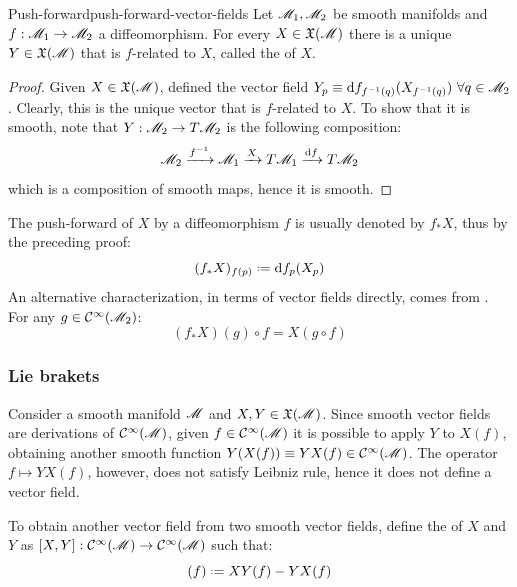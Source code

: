 \begin{theorem}{Push-forward}{push-forward-vector-fields}
  Let $ \mathscr{M}_1 , \mathscr{M}_2 $ be smooth manifolds and $ f : \mathscr{M}_1 \rightarrow \mathscr{M}_2 $ a diffeomorphism. For every $ X \in \mathfrak{X}(\mathscr{M}) $ there is a unique $ Y \in \mathfrak{X}(\mathscr{M}) $ that is $ f $-related to $ X $, called the  of $ X $.
\end{theorem}

\begin{proofbox}
  \begin{proof}
    Given $ X \in \mathfrak{X}(\mathscr{M}) $, defined the vector field $ Y_p \equiv \mathrm{d} f_{f^{-1}(q)}(X_{f^{-1}(q)}) \,\,\forall q \in \mathscr{M}_2 $. Clearly, this is the unique vector that is $ f $-related to $ X $. To show that it is smooth, note that $ Y : \mathscr{M}_2 \rightarrow T\mathscr{M}_2 $ is the following composition:
    \begin{equation*}
      \mathscr{M}_2 \xrightarrow{f^{-1}} \mathscr{M}_1 \xrightarrow{X} T\mathscr{M}_1 \xrightarrow{\mathrm{d} f} T\mathscr{M}_2
    \end{equation*}
    which is a composition of smooth maps, hence it is smooth.
  \end{proof}
\end{proofbox}

The push-forward of $ X $ by a diffeomorphism $ f $ is usually denoted by $ f_* X $, thus by the preceding proof:
\begin{equation}
  (f_* X)_{f(p)} \defeq \dd f_p (X_p)
\end{equation}
An alternative characterization, in terms of vector fields directly, comes from . For any $ g \in \mathcal{C}^{\infty}(\mathscr{M}_2) $:
\begin{equation}
  (f_* X)(g) \circ f = X(g \circ f)
\end{equation}

\subsubsection{Lie brakets}

Consider a smooth manifold $ \mathscr{M} $ and $ X,Y \in \mathfrak{X}(\mathscr{M}) $. Since smooth vector fields are derivations of $ \mathcal{C}^{\infty}(\mathscr{M}) $, given $ f \in \mathcal{C}^{\infty}(\mathscr{M}) $ it is possible to apply $ Y $ to $ X(f) $, obtaining another smooth function $ Y(X(f)) \equiv YX(f) \in \mathcal{C}^{\infty}(\mathscr{M}) $. The operator $ f \mapsto YX(f) $, however, does not satisfy Leibniz rule, hence it does not define a vector field.

To obtain another vector field from two smooth vector fields, define the  of $ X $ and $ Y $ as $ [X,Y] : \mathcal{C}^{\infty}(\mathscr{M}) \rightarrow \mathcal{C}^{\infty}(\mathscr{M}) $ such that:
\begin{equation}
  [X,Y](f) \defeq XY(f) - YX(f)
\end{equation}

